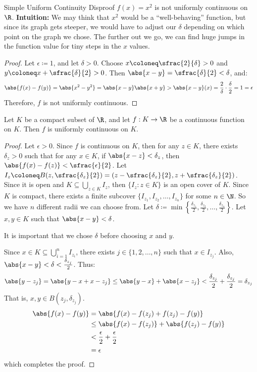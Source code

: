 \begin{exbox}{Simple Uniform Continuity Disproof}{}
    $f(x) = x^2$ is not uniformly continuous on $\R$.
    \tcblower
    \textbf{Intuition:} We may think that $x^2$ would be a ``well-behaving'' function, but since its graph gets steeper, we would have to adjust our $\delta$ depending on which point on the graph we chose. The further out we go, we can find huge jumps in the function value for tiny steps in the $x$ values.
    \begin{proof}
        Let $\epsilon \coloneq 1$, and let $\delta > 0$. Choose $x \coloneq \sfrac{2}{\delta} > 0$ and $y \coloneq x + \sfrac{\delta}{2} > 0$. Then \( \abs{x-y} = \sfrac{\delta}{2} < \delta \), and:
        \[ \abs{f(x) - f(y)} = \abs{x^2 - y^2} = \abs{x-y}\abs{x+y} > \abs{x-y} (x) = \frac{2}{\delta} \cdot \frac{\delta}{2} = 1 = \epsilon \]
        Therefore, $f$ is not uniformly continuous.
    \end{proof}
\end{exbox}

\begin{thmbox}{}{}
    Let $K$ be a compact subset of $\R$, and let $f : K \to \R$ be a continuous function on $K$. Then $f$ is uniformly continuous on $K$.
    \tcblower
    \begin{proof}
        Let $\epsilon > 0$. Since $f$ is continuous on $K$, then for any $z \in K$, there exists $\delta_z > 0$ such that for any $x \in K$, if $\abs{x-z} < \delta_z$, then $\abs{f(x) - f(z)} < \sfrac{\epsilon}{2}$. Let $I_z \coloneq B(z, \sfrac{\delta_z}{2}) = (z - \sfrac{\delta_z}{2}, z + \sfrac{\delta_z}{2})$. Since it is open and $K \subseteq \bigcup_{z \in K} I_z$, then $\{ I_z : z \in K \}$ is an open cover of $K$. Since $K$ is compact, there exists a finite subcover $\{ I_{z_1}, I_{z_2}, \ldots, I_{z_n} \}$ for some $n \in \N$. So we have $n$ different radii we can choose from. Let $\delta \coloneq \min\left\{ \frac{\delta_{z_1}}{2}, \frac{\delta_{z_2}}{2}, \ldots, \frac{\delta_{z_n}}{2} \right\}$. Let $x,y \in K$ such that $\abs{x-y} < \delta$.
        \begin{notebox}
            It is important that we chose $\delta$ before choosing $x$ and $y$.
        \end{notebox}
        Since $x \in K \subseteq \bigcup_{i = 1}^{n} I_{z_i}$, there exists $j \in \{1, 2, \ldots, n\}$ such that $x \in I_{z_j}$. Also, $\abs{x-y} < \delta < \frac{\delta_{z_j}}{2}$. Thus:
        \[ \abs{y - z_j} = \abs{y - x + x - z_j} \leq \abs{y-x} + \abs{x - z_j} < \frac{\delta_{z_j}}{2} + \frac{\delta_{z_j}}{2} = \delta_{z_j} \]
        That is, $x,y \in B(z_j, \delta_{z_j})$. 
        \begin{align*}
            \abs{f(x) - f(y)}
            &= \abs{f(x) - f(z_j) + f(z_j) - f(y)} \\
            &\leq \abs{f(x) - f(z_j)} + \abs{f(z_j) - f(y)} \\
            &< \frac{\epsilon}{2} + \frac{\epsilon}{2} \\
            &= \epsilon
        \end{align*}
        which completes the proof.
    \end{proof}
\end{thmbox}
